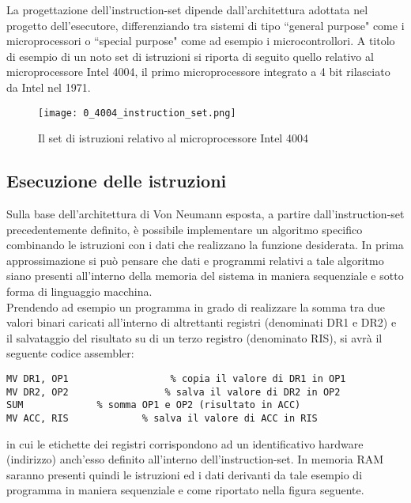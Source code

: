 La progettazione dell'instruction-set dipende dall'architettura adottata nel progetto dell'esecutore, differenziando tra sistemi di tipo \textquotedblleft general purpose" come i microprocessori o \textquotedblleft special purpose" come ad esempio i microcontrollori.
A titolo di esempio di un noto set di istruzioni si riporta di seguito quello relativo al microprocessore Intel 4004, il primo microprocessore integrato a 4 bit rilasciato da Intel nel 1971.
\newpage \null \vfill
\begin{figure}[H]
	\centering
	\texttt{[image: 0\_4004\_instruction\_set.png]}
	\caption{Il set di istruzioni relativo al microprocessore Intel 4004}
	\label{fig:4004_instruction_set}
\end{figure}
\newpage

\subsection*{Esecuzione delle istruzioni}
Sulla base dell'architettura di Von Neumann esposta, a partire dall'instruction-set precedentemente definito, è possibile implementare un algoritmo specifico combinando le istruzioni con i dati che realizzano la funzione desiderata. In prima approssimazione si può pensare che dati e programmi relativi a tale algoritmo siano presenti all'interno della memoria del sistema in maniera sequenziale e sotto forma di linguaggio macchina.\\
Prendendo ad esempio un programma in grado di realizzare la somma tra due valori binari caricati all'interno di altrettanti registri (denominati DR1 e DR2) e il salvataggio del risultato su di un terzo registro (denominato RIS), si avrà il seguente codice assembler:
\begin{lstlisting}[frame=single] 
MV DR1, OP1					 % copia il valore di DR1 in OP1
MV DR2, OP2				 	% salva il valore di DR2 in OP2
SUM				% somma OP1 e OP2 (risultato in ACC)
MV ACC, RIS				% salva il valore di ACC in RIS
\end{lstlisting}
in cui le etichette dei registri corrispondono ad un identificativo hardware (indirizzo) anch'esso definito all'interno dell'instruction-set.
In memoria RAM saranno presenti quindi le istruzioni ed i dati derivanti da tale esempio di programma in maniera sequenziale e come riportato nella figura seguente.
